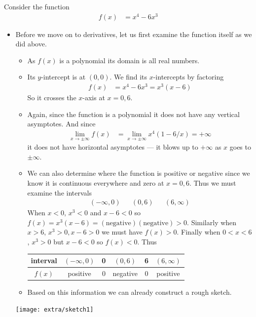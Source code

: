 \begin{eg}\label{eg sketch simple poly}
Consider the function
\begin{align*}
  f(x) &= x^4-6x^3
\end{align*}

\begin{itemize}
 \item Before we move on to derivatives, let us first examine the function itself as we
did above.
\begin{itemize}
 \item As $f(x)$ is a polynomial its domain is all real numbers.
\item Its $y$-intercept is at $(0,0)$. We find its $x$-intercepts by factoring
\begin{align*}
  f(x) &=x^4-6x^3 = x^3(x-6)
\end{align*}
So it crosses the $x$-axis at $x=0,6$.

 \item Again, since the function is a polynomial it does not have any vertical
asymptotes. And since
\begin{align*}
  \lim_{x \to \pm \infty} f(x) &=
  \lim_{x \to \pm \infty} x^4(1-6/x) = +\infty
\end{align*}
it does not have horizontal asymptotes --- it blows up to $+\infty$ as $x$ goes to
$\pm\infty$.

\item We can also determine where the function is positive or negative since we
know it is continuous everywhere and zero at $x=0,6$. Thus we must examine the intervals
\begin{align*}
  (-\infty,0)&& (0,6) && (6,\infty)
\end{align*}
When $x<0$, $x^3<0$ and $x-6<0$ so $f(x) = x^3(x-6) = (\text{negative})(\text{negative})
> 0$. Similarly when $x>6$, $x^3>0, x-6>0$ we must have $f(x)>0$. Finally when $0<x<6$,
$x^3>0$ but $x-6<0$ so $f(x)<0$. Thus
\begin{center}
\begin{tabular}{|c|c||c||c||c||c|}
\hline
interval & $(-\infty,0)$ & 0 & $(0,6)$ & 6 & $(6,\infty)$\\
\hline
$f(x)$ & positive & 0 & negative & 0 & positive \\
\hline
\end{tabular}
\end{center}
\item Based on this information we can already construct a rough sketch.
\end{itemize}
\begin{efig}
 \begin{center}
  \texttt{[image: extra/sketch1]}
 \end{center}
\end{efig}


\end{itemize}
\end{eg}
